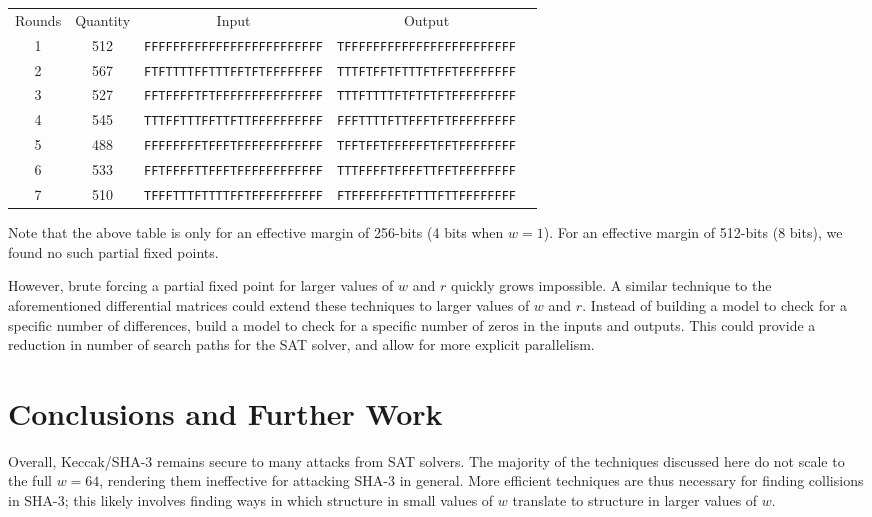 \documentclass[10pt,twocolumn,twoside]{pnas-new}
\begin{document}
\begin{tabular}{c c c c c} \label{tab:f:p:1}
    Rounds & Quantity & Input & Output \\
    1 & 512 & \texttt{FFFFFFFFFFFFFFFFFFFFFFFFF} & \texttt{TFFFFFFFFFFFFFFFFFFFFFFFF} \\
    2 & 567 & \texttt{FTFTTTTFFTTTFFTFTFFFFFFFF} & \texttt{TTTFTFFTFTTTFTFFTFFFFFFFF} \\
    3 & 527 & \texttt{FFTFFFFTFTFFFFFFFFFFFFFFF} & \texttt{TTTFTTTTFTFTFTFTFFFFFFFFF} \\
    4 & 545 & \texttt{TTTFFTTTFFTTFTTFFFFFFFFFF} & \texttt{FFFTTTTFTTFFFTFTFFFFFFFFF} \\
    5 & 488 & \texttt{FFFFFFFFTFFFTFFFFFFFFFFFF} & \texttt{TFFTFFTFFFFFFTFFTFFFFFFFF} \\
    6 & 533 & \texttt{FFTFFFFTTFFFTFFFFFFFFFFFF} & \texttt{TTTFFFFTFFFFTTFFTFFFFFFFF} \\
    7 & 510 & \texttt{TFFFTTTFTTTTFFTFFFFFFFFFF} & \texttt{FTFFFFFFFTFTTTFTTFFFFFFFF} \\
\end{tabular}

Note that the above table is only for an effective margin of 256-bits (4 bits
when $w=1$). For an effective margin of 512-bits (8 bits), we found no such
partial fixed points.

However, brute forcing a partial fixed point for larger values of $w$ and $r$
quickly grows impossible. A similar technique to the aforementioned
differential matrices could extend these techniques to larger values of $w$
and $r$. Instead of building a model to check for a specific number of
differences, build a model to check for a specific number of zeros in
the inputs and outputs. This could provide a reduction in number of search
paths for the SAT solver, and allow for more explicit parallelism.



\section{Conclusions and Further Work} \label{sec:conclusion}

Overall, Keccak/SHA-3 remains secure to many attacks from SAT solvers. The
majority of the techniques discussed here do not scale to the full $w=64$,
rendering them ineffective for attacking SHA-3 in general. More efficient
techniques are thus necessary for finding collisions in SHA-3; this likely
involves finding ways in which structure in small values of $w$ translate to
structure in larger values of $w$.
\end{document}
